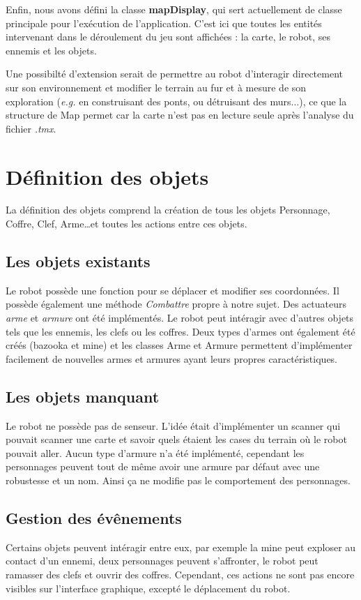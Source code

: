 \documentclass[a4paper 12pts]{article}
\begin{document}
Enfin, nous avons défini la classe \textbf{mapDisplay}, qui sert actuellement de classe principale pour l'exécution de l'application. C'est ici que toutes les entités intervenant dans le déroulement du jeu sont affichées : la carte, le robot, ses ennemis et les objets.

Une possibilté d'extension serait de permettre au robot d'interagir directement sur son environnement et modifier le terrain au fur et à mesure de son exploration (\emph{e.g.} en construisant des ponts, ou détruisant des murs...), ce que la structure de Map permet car la carte n'est pas en lecture seule après l'analyse du fichier \emph{.tmx}. 



\section{Définition des objets}
La définition des objets comprend la création de tous les objets Personnage, Coffre, Clef, Arme\ldots et toutes les actions entre ces objets.

\subsection{Les objets existants}
Le robot possède une fonction pour se déplacer et modifier ses coordonnées. Il possède également une méthode \emph{Combattre} propre à notre sujet. Des actuateurs \emph{arme} et \emph{armure} ont été implémentés. Le robot peut intéragir avec d'autres objets tels que les ennemis, les clefs ou les coffres. Deux types d'armes ont également été créés (bazooka et mine) et les classes Arme et Armure permettent d'implémenter facilement de nouvelles armes et armures ayant leurs propres caractéristiques.

\subsection{Les objets manquant}
Le robot ne possède pas de senseur. L'idée était d'implémenter un scanner qui pouvait scanner une carte et savoir quels étaient les cases du terrain où le robot pouvait aller. Aucun type d'armure n'a été implémenté, cependant les personnages peuvent tout de même avoir une armure par défaut avec une robustesse et un nom. Ainsi ça ne modifie pas le comportement des personnages.

\subsection{Gestion des évênements}
Certains objets peuvent intéragir entre eux, par exemple la mine peut exploser au contact d'un ennemi, deux personnages peuvent s'affronter, le robot peut ramasser des clefs et ouvrir des coffres. Cependant, ces actions ne sont pas encore visibles sur l'interface graphique, excepté le déplacement du robot.
\end{document}
